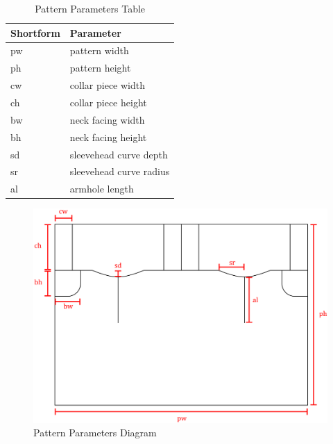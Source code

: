 \begin{table} [H] %
    \centering %
    \begin{tabular}{p{2cm}|p{5cm}} %
    
        \textbf{Shortform} & \textbf{Parameter}\\
        \hline %
        pw& pattern width\\
        ph& pattern height\\
        cw& collar piece width\\
        ch& collar piece height\\
        bw& neck facing width\\
        bh& neck facing height\\
        sd& sleevehead curve depth\\
        sr& sleevehead curve radius\\
        al& armhole length
        \end{tabular}
    \caption{Pattern Parameters Table}
\end{table}
\begin{figure} [H] %
    \centering %
    \includegraphics[width = \textwidth]{Images/pattern params.png} %
    \caption{Pattern Parameters Diagram}
\end{figure}

